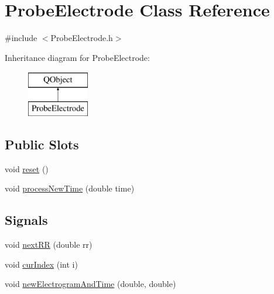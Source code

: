 \hypertarget{class_probe_electrode}{\section{Probe\+Electrode Class Reference}
\label{class_probe_electrode}
}


{\ttfamily \#include $<$Probe\+Electrode.\+h$>$}

Inheritance diagram for Probe\+Electrode\+:\begin{figure}[H]
\begin{center}
\leavevmode
\includegraphics[height=2.000000cm]{class_probe_electrode}
\end{center}
\end{figure}
\subsection*{Public Slots}
\begin{DoxyCompactItemize}
\item 
void \hyperlink{class_probe_electrode_a532617824c146216c8b6dad12aa15c6b}{reset} ()
\item 
void \hyperlink{class_probe_electrode_abfb9646b90f411e4613eea7a286c99f1}{process\+New\+Time} (double time)
\end{DoxyCompactItemize}
\subsection*{Signals}
\begin{DoxyCompactItemize}
\item 
void \hyperlink{class_probe_electrode_adc2e6089a57241a604135b14c59343f0}{next\+R\+R} (double rr)
\item 
void \hyperlink{class_probe_electrode_a46067c4a2b7476692e48fb69c6ff5c77}{cur\+Index} (int i)
\item 
void \hyperlink{class_probe_electrode_a45de8a8979f160059a250f0ca0fdde22}{new\+Electrogram\+And\+Time} (double, double)
\end{DoxyCompactItemize}
